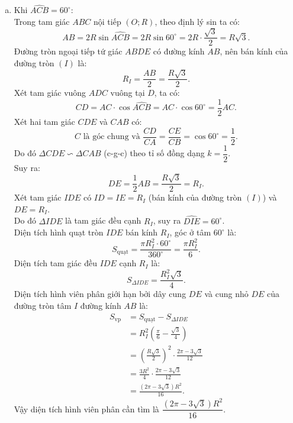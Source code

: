 \begin{bt}
{\begin{enumerate}[a)]
		Vì $I$ là trung điểm của đường chéo $AB$ nên $I$ cũng là trung điểm của đường chéo $HK$.\\
		Do đó ba điểm $H, I, K$ thẳng hàng.
		\item Khi $\widehat{ACB} = 60^\circ$:\\
		Trong tam giác $ABC$ nội tiếp $(O; R)$, theo định lý sin ta có:
		$$AB = 2R \sin \widehat{ACB} = 2R \sin 60^\circ = 2R \cdot \frac{\sqrt{3}}{2} = R\sqrt{3}.$$
		Đường tròn ngoại tiếp tứ giác $ABDE$ có đường kính $AB$, nên bán kính của đường tròn $(I)$ là:
		$$R_I = \frac{AB}{2} = \frac{R\sqrt{3}}{2}.$$
		Xét tam giác vuông $ADC$ vuông tại $D$, ta có:
		$$CD = AC \cdot \cos \widehat{ACB} = AC \cdot \cos 60^\circ = \frac{1}{2}AC.$$
		Xét hai tam giác $CDE$ và $CAB$ có:
		$$\widehat{C} \text{ là góc chung và } \frac{CD}{CA} = \frac{CE}{CB} = \cos 60^\circ = \frac{1}{2}.$$
		Do đó $\Delta CDE \backsim \Delta CAB$ (c-g-c) theo tỉ số đồng dạng $k = \dfrac{1}{2}$.\\
		Suy ra:
		$$DE = \frac{1}{2}AB = \frac{R\sqrt{3}}{2} = R_I.$$
		Xét tam giác $IDE$ có $ID = IE = R_I$ (bán kính của đường tròn $(I)$) và $DE = R_I$.\\
		Do đó $\Delta IDE$ là tam giác đều cạnh $R_I$, suy ra $\widehat{DIE} = 60^\circ$.\\
		Diện tích hình quạt tròn $IDE$ bán kính $R_I$, góc ở tâm $60^\circ$ là:
		$$S_{\text{quạt}} = \frac{\pi R_I^2 \cdot 60^\circ}{360^\circ} = \frac{\pi R_I^2}{6}.$$
		Diện tích tam giác đều $IDE$ cạnh $R_I$ là:
		$$S_{\Delta IDE} = \frac{R_I^2 \sqrt{3}}{4}.$$
		Diện tích hình viên phân giới hạn bởi dây cung $DE$ và cung nhỏ $DE$ của đường tròn tâm $I$ đường kính $AB$ là:
		\begin{align*}
		S_{\text{vp}} &= S_{\text{quạt}} - S_{\Delta IDE} \\
		&= R_I^2 \left(\frac{\pi}{6} - \frac{\sqrt{3}}{4}\right) \\
		&= \left(\frac{R\sqrt{3}}{2}\right)^2 \cdot \frac{2\pi - 3\sqrt{3}}{12} \\
		&= \frac{3R^2}{4} \cdot \frac{2\pi - 3\sqrt{3}}{12} \\
		&= \frac{(2\pi - 3\sqrt{3})R^2}{16}.
		\end{align*}
		Vậy diện tích hình viên phân cần tìm là $\dfrac{(2\pi - 3\sqrt{3})R^2}{16}$.
	\end{enumerate}
}
\end{bt}
